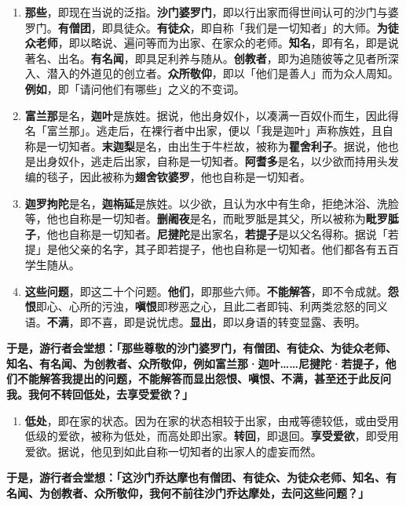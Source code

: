 \begin{enumerate}\item \textbf{那些}，即现在当说的泛指。\textbf{沙门婆罗门}，即以行出家而得世间认可的沙门与婆罗门。\textbf{有僧团}，即具徒众。\textbf{有徒众}，即自称「我们是一切知者」的大师。\textbf{为徒众老师}，即以略说、遍问等而为出家、在家众的老师。\textbf{知名}，即有名，即是说著名、出名。\textbf{有名闻}，即具足利养与随从。\textbf{创教者}，即为追随彼等之见者所深入、潜入的外道见的创立者。\textbf{众所敬仰}，即以「他们是善人」而为众人周知。\textbf{例如}，即「请问他们有哪些」之义的不变词。
\item \textbf{富兰那}是名，\textbf{迦叶}是族姓。据说，他出身奴仆，以凑满一百奴仆而生，因此得名「富兰那」。逃走后，在裸行者中出家，便以「我是迦叶」声称族姓，且自称是一切知者。\textbf{末迦梨}是名，由出生于牛栏故，被称为\textbf{瞿舍利子}。据说，他也是出身奴仆，逃走后出家，自称是一切知者。\textbf{阿耆多}是名，以少欲而持用头发编的毯子，因此被称为\textbf{翅舍钦婆罗}，他也自称是一切知者。
\item \textbf{迦罗拘陀}是名，\textbf{迦栴延}是族姓。以少欲，且认为水中有生命，拒绝沐浴、洗脸等，他也自称是一切知者。\textbf{删阇夜}是名，而毗罗胝是其父，所以被称为\textbf{毗罗胝子}，他也自称是一切知者。\textbf{尼揵陀}是出家名，\textbf{若提子}是以父名得称。据说「若提」是他父亲的名字，其子即若提子，他也自称是一切知者。他们都各有五百学生随从。
\item \textbf{这些问题}，即这二十个问题。\textbf{他们}，即那些六师。\textbf{不能解答}，即不令成就。\textbf{怨恨}即心、心所的污浊，\textbf{嗔恨}即秽恶之心，且此二者即钝、利两类忿怒的同义语。\textbf{不满}，即不喜，即是说忧虑。\textbf{显出}，即以身语的转变显露、表明。\end{enumerate}

\textbf{于是，游行者会堂想：「那些尊敬的沙门婆罗门，有僧团、有徒众、为徒众老师、知名、有名闻、为创教者、众所敬仰，例如富兰那·迦叶……尼揵陀·若提子，他们不能解答我提出的问题，不能解答而显出怨恨、嗔恨、不满，甚至还于此反问我。我何不转回低处，去享受爱欲？」}

\begin{enumerate}\item \textbf{低处}，即在家的状态。因为在家的状态相较于出家，由戒等德较低，或由受用低级的爱欲，被称为低处，而高处即出家。\textbf{转回}，即退回。\textbf{享受爱欲}，即受用爱欲。据说，他见到如此自称一切知者的出家人的虚妄而然。\end{enumerate}

\textbf{于是，游行者会堂想：「这沙门乔达摩也有僧团、有徒众、为徒众老师、知名、有名闻、为创教者、众所敬仰，我何不前往沙门乔达摩处，去问这些问题？」}

